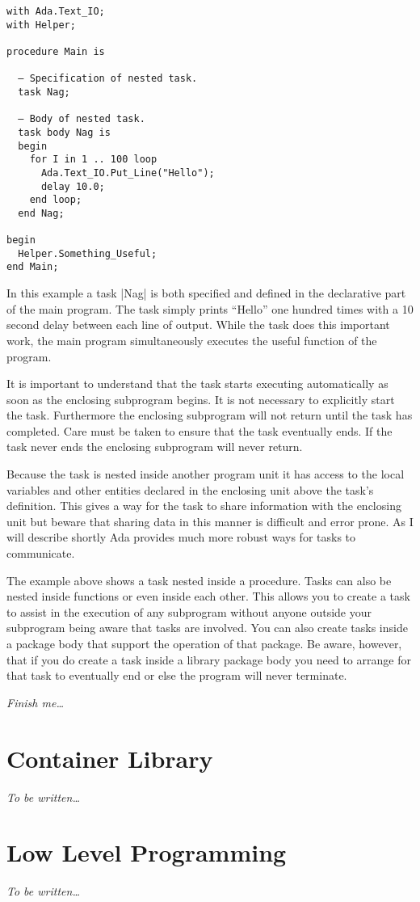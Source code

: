 \begin{lstlisting}
with Ada.Text_IO;
with Helper;

procedure Main is

  – Specification of nested task.
  task Nag;

  – Body of nested task.
  task body Nag is
  begin
    for I in 1 .. 100 loop
      Ada.Text_IO.Put_Line("Hello");
      delay 10.0;
    end loop;
  end Nag;

begin
  Helper.Something_Useful;
end Main;
\end{lstlisting}

In this example a task |Nag| is both specified and defined in the declarative part of the main
program. The task simply prints ``Hello'' one hundred times with a 10 second delay between each
line of output. While the task does this important work, the main program simultaneously
executes the useful function of the program.

It is important to understand that the task starts executing automatically as soon as the
enclosing subprogram begins. It is not necessary to explicitly start the task. Furthermore the
enclosing subprogram will not return until the task has completed. Care must be taken to ensure
that the task eventually ends. If the task never ends the enclosing subprogram will never
return.

Because the task is nested inside another program unit it has access to the local variables and
other entities declared in the enclosing unit above the task's definition. This gives a way for
the task to share information with the enclosing unit but beware that sharing data in this
manner is difficult and error prone. As I will describe shortly Ada provides much more robust
ways for tasks to communicate.

The example above shows a task nested inside a procedure. Tasks can also be nested inside
functions or even inside each other. This allows you to create a task to assist in the execution
of any subprogram without anyone outside your subprogram being aware that tasks are involved.
You can also create tasks inside a package body that support the operation of that package. Be
aware, however, that if you do create a task inside a library package body you need to arrange
for that task to eventually end or else the program will never terminate.

\textit{Finish me\ldots}

\section{Container Library}

\textit{To be written\ldots}

\section{Low Level Programming}

\textit{To be written\ldots}

